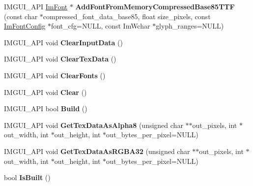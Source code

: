 \begin{DoxyCompactItemize}
I\+M\+G\+U\+I\+\_\+\+A\+PI \hyperlink{structImFont}{Im\+Font} $\ast$ {\bfseries Add\+Font\+From\+Memory\+Compressed\+Base85\+T\+TF} (const char $\ast$compressed\+\_\+font\+\_\+data\+\_\+base85, float size\+\_\+pixels, const \hyperlink{structImFontConfig}{Im\+Font\+Config} $\ast$font\+\_\+cfg=N\+U\+LL, const Im\+Wchar $\ast$glyph\+\_\+ranges=N\+U\+LL)
\item 
\mbox{\label{structImFontAtlas_a3f5bcbb7a2683b1af106fcf4e1217662}} 
I\+M\+G\+U\+I\+\_\+\+A\+PI void {\bfseries Clear\+Input\+Data} ()
\item 
\mbox{\label{structImFontAtlas_a3ede4bd513bec044c77ac392ad9c6e86}} 
I\+M\+G\+U\+I\+\_\+\+A\+PI void {\bfseries Clear\+Tex\+Data} ()
\item 
\mbox{\label{structImFontAtlas_ad5c2560d708bd0c389e9bd9da2d9b055}} 
I\+M\+G\+U\+I\+\_\+\+A\+PI void {\bfseries Clear\+Fonts} ()
\item 
\mbox{\label{structImFontAtlas_a8f6d01c671d8670f991ba651bbaf7e77}} 
I\+M\+G\+U\+I\+\_\+\+A\+PI void {\bfseries Clear} ()
\item 
\mbox{\label{structImFontAtlas_a81e39e30dffa4dd7e458a53297451e27}} 
I\+M\+G\+U\+I\+\_\+\+A\+PI bool {\bfseries Build} ()
\item 
\mbox{\label{structImFontAtlas_aeff1a1044a1ab68d8f27bb2819cd9f44}} 
I\+M\+G\+U\+I\+\_\+\+A\+PI void {\bfseries Get\+Tex\+Data\+As\+Alpha8} (unsigned char $\ast$$\ast$out\+\_\+pixels, int $\ast$out\+\_\+width, int $\ast$out\+\_\+height, int $\ast$out\+\_\+bytes\+\_\+per\+\_\+pixel=N\+U\+LL)
\item 
\mbox{\label{structImFontAtlas_a8abb0c4e67ebb38249d4df71218c4eec}} 
I\+M\+G\+U\+I\+\_\+\+A\+PI void {\bfseries Get\+Tex\+Data\+As\+R\+G\+B\+A32} (unsigned char $\ast$$\ast$out\+\_\+pixels, int $\ast$out\+\_\+width, int $\ast$out\+\_\+height, int $\ast$out\+\_\+bytes\+\_\+per\+\_\+pixel=N\+U\+LL)
\item 
\mbox{\label{structImFontAtlas_a208b0ad1ada507d1c4309ea6dfedafb6}} 
bool {\bfseries Is\+Built} ()
\item 

\end{DoxyCompactItemize}
